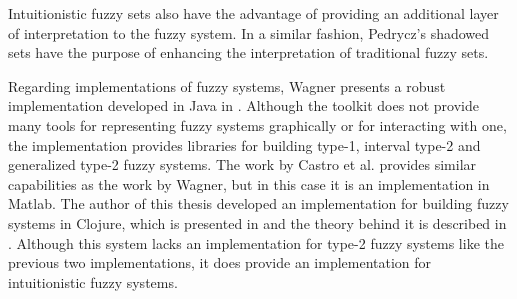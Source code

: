 Intuitionistic fuzzy sets also have the advantage of providing an additional
layer of interpretation to the fuzzy system. In a similar fashion, Pedrycz's
shadowed sets \cite{Pedrycz1998} have the purpose of enhancing the
interpretation of traditional fuzzy sets.

Regarding implementations of fuzzy systems, Wagner presents a robust
implementation developed in Java in \cite{Wagner2013}. Although the toolkit does
not provide many tools for representing fuzzy systems graphically or for
interacting with one, the implementation provides libraries for building type-1,
interval type-2 and generalized type-2 fuzzy systems. The work by Castro et
al. \cite{castro2007interval} provides similar capabilities as the work by
Wagner, but in this case it is an implementation in Matlab. The author of this
thesis developed an implementation for building fuzzy systems in Clojure, which
is presented in \cite{Hernandez-Aguila2017} and the theory behind it is
described in \cite{Hernandez-aguila2016}. Although this system lacks an
implementation for type-2 fuzzy systems like the previous two implementations,
it does provide an implementation for intuitionistic fuzzy systems.



